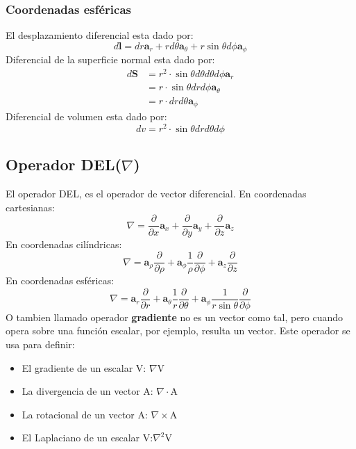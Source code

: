 \documentclass[11pt,fleqn]{book} %
\begin{document}
\subsubsection{Coordenadas esféricas}
El desplazamiento diferencial esta dado por:
\begin{equation}
\boxed{d\textbf{l}=dr\textbf{a}_r+r d\theta\textbf{a}_{\theta}+r\sin\theta d\phi\textbf{a}_{\phi}}
\end{equation}
Diferencial de la superficie normal esta dado por:
\begin{equation}
\boxed{\begin{split}
d\textbf{S}&=r^2\cdot\sin\theta d\theta d\theta d\phi \textbf{a}_r\\
&=r\cdot\sin\theta dr d\phi\textbf{a}_{\theta}\\
&=r\cdot dr d\theta\textbf{a}_{\phi}
\end{split}}
\end{equation}
Diferencial de volumen esta dado por:
\begin{equation}
\boxed{dv=r^2\cdot\sin\theta dr d\theta d\phi}
\end{equation}
\subsection{Operador DEL($\nabla$)}
El operador DEL, es el operador de vector diferencial. En coordenadas cartesianas:
\begin{equation}
\boxed{\nabla=\frac{\partial}{\partial x}\textbf{a}_x+\frac{\partial}{\partial y}\textbf{a}_y+\frac{\partial}{\partial z}\textbf{a}_z}
\end{equation}
En coordenadas cilíndricas:
\begin{equation}
\boxed{\nabla=\textbf{a}_{\rho}\frac{\partial}{\partial\rho}+\textbf{a}_{\phi}\frac{1}{\rho}\frac{\partial}{\partial\phi}+\textbf{a}_z\frac{\partial}{\partial z}}
\end{equation}
En coordenadas esféricas:
\begin{equation}
\boxed{\nabla=\textbf{a}_r\frac{\partial}{\partial r}+\textbf{a}_{\theta}\frac{1}{r}\frac{\partial}{\partial\theta}+\textbf{a}_{\phi}\frac{1}{r\sin\theta}\frac{\partial}{\partial \phi}}
\end{equation}
O tambien llamado operador \textbf{gradiente} no es un vector como tal, pero cuando opera sobre una función escalar, por ejemplo, resulta un vector. Este operador se usa para definir:
\begin{itemize}
\item El gradiente de un escalar V: $\nabla$V
\item La divergencia de un vector A: $\nabla\cdot$A
\item La rotacional de un vector A: $\nabla\times$A
\item El Laplaciano de un escalar V:$\nabla^2$V
\end{itemize}
\end{document}
